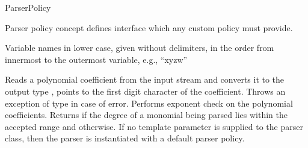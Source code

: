 \begin{ccRefConcept}{ParserPolicy}

\ccDefinition

Parser policy concept defines interface which any custom policy must provide.

\ccConstants

{Variable names in lower case, given without delimiters, in the order from innermost to the outermost variable, 
e.g., ``xyzw''}\ccGlue
{}\ccGlue
{}

\ccTypes


\ccGlue
{}

\ccOperations
{}
{Reads a polynomial coefficient from the input stream  
and converts it to the output type ,  points to the first 
digit character of the coefficient. Throws an exception of type  
in case of error.}\ccGlue
{}
{Performs exponent check on the polynomial coefficients. Returns 
if the degree  of a monomial being parsed lies within the accepted range and  otherwise.}
If no  template parameter is supplied to the parser class,
then the parser is instantiated with a default parser policy.\\ 

\ccSeeAlso

\ccHasModels

\\
\\
\\

\end{ccRefConcept}

